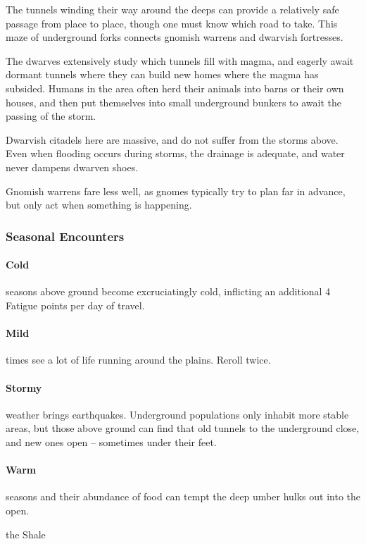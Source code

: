 \begin{multicols}{2}
The tunnels winding their way around the deeps can provide a relatively safe passage from place to place, though one must know which road to take.
This maze of underground forks connects gnomish warrens and dwarvish fortresses.

The dwarves extensively study which tunnels fill with magma, and eagerly await dormant tunnels where they can build new homes where the magma has subsided.
Humans in the area often herd their animals into barns or their own houses, and then put themselves into small underground bunkers to await the passing of the storm.

Dwarvish citadels here are massive, and do not suffer from the storms above.
Even when flooding occurs during storms, the drainage is adequate, and water never dampens dwarven shoes.

Gnomish warrens fare less well, as gnomes typically try to plan far in advance, but only act when something is happening.

\subsubsection{Seasonal Encounters}

\paragraph{Cold} seasons above ground become excruciatingly cold, inflicting an additional 4 Fatigue points per day of travel.
\paragraph{Mild} times see a lot of life running around the plains.
Reroll twice.
\paragraph{Stormy} weather brings earthquakes.
Underground populations only inhabit more stable areas, but those above ground can find that old tunnels to the underground close, and new ones open -- sometimes under their feet.
\paragraph{Warm} seasons and their abundance of food can tempt the deep umber hulks out into the open.

\label{bearded_encounters}

\begin{encounters}{the Shale}


\end{encounters}
\end{multicols}
